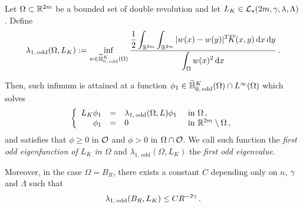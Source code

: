 \begin{lemma}
	\label{Lemma:FirstOddEigenfunction}
	Let $\Omega\subset \mathbb{R}^{2m} $ be a bounded set of double revolution and let $L_K\in \mathcal{L}_\star(2m,\gamma,\lambda, \Lambda)$. Define 
	\begin{equation}
	\label{Eq:DefLambda1}
	\lambda_{1, \, \mathrm{odd}}(\Omega, L_K) := \inf_{w \in \widetilde{\mathbb{H}}^K_{0, \, \mathrm{odd}}(\Omega)} \dfrac{\dfrac{1}{2}  \displaystyle\int_{\mathbb{R}^{2m}} \int_{\mathbb{R}^{2m}} |w(x) - w(y)|^2 \overline{K}(x,y) \,\mathrm{d} x \,\mathrm{d} y}{ \displaystyle \int_\Omega w(x)^2 \,\mathrm{d} x}\,.
	\end{equation}
	
	Then, such infimum is attained at a function $\phi_1\in \widetilde{\mathbb{H}}^K_{0, \, \mathrm{odd}}(\Omega)\cap L^\infty(\Omega)$ which solves
	$$
	\left\{\begin{array}{rcll}
	L_K \phi_1 &=& \lambda_{1, \, \mathrm{odd}}(\Omega, L) \phi_1 & \textrm{ in } \Omega\,,\\
	\phi_1 & = & 0 & \textrm{ in } \mathbb{R}^{2m}\setminus \Omega\,,
	\end{array} \right.
	$$
	and satisfies that $\phi \geq 0$ in $\mathcal{O}$ and $\phi > 0$ in $\Omega \cap \mathcal{O}$.
	We call such function the \emph{first odd eigenfunction of $L_K$ in $\Omega$} and $\lambda_{1, \, \mathrm{odd}}(\Omega, L_K) $ the \emph{first odd eigenvalue}. 
	
	Moreover, in the case $\Omega = B_R$, there exists a constant $C$ depending only on $n$, $\gamma$ and $\Lambda$ such that
	$$
	\lambda_{1, \, \mathrm{odd}}(B_R, L_K) \leq C R^{-2\gamma}\,. 
	$$ 
\end{lemma}


